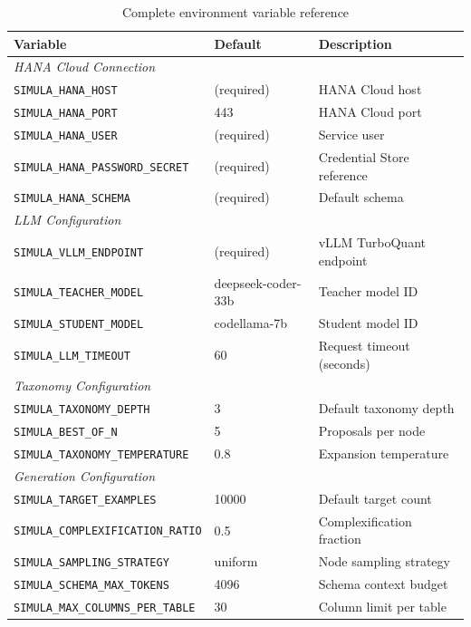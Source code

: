 \documentclass[12pt,a4paper,twoside]{report}
\begin{document}
\begin{table}[H]
\centering
\caption{Complete environment variable reference}
\label{tab:env-vars-complete}
\scriptsize
\begin{tabularx}{\textwidth}{@{}l l X@{}}
\toprule
\textbf{Variable} & \textbf{Default} & \textbf{Description} \\
\midrule
\multicolumn{3}{l}{\textit{HANA Cloud Connection}} \\
\texttt{SIMULA\_HANA\_HOST} & (required) & HANA Cloud host \\
\texttt{SIMULA\_HANA\_PORT} & 443 & HANA Cloud port \\
\texttt{SIMULA\_HANA\_USER} & (required) & Service user \\
\texttt{SIMULA\_HANA\_PASSWORD\_SECRET} & (required) & Credential Store reference \\
\texttt{SIMULA\_HANA\_SCHEMA} & (required) & Default schema \\
\midrule
\multicolumn{3}{l}{\textit{LLM Configuration}} \\
\texttt{SIMULA\_VLLM\_ENDPOINT} & (required) & vLLM TurboQuant endpoint \\
\texttt{SIMULA\_TEACHER\_MODEL} & deepseek-coder-33b & Teacher model ID \\
\texttt{SIMULA\_STUDENT\_MODEL} & codellama-7b & Student model ID \\
\texttt{SIMULA\_LLM\_TIMEOUT} & 60 & Request timeout (seconds) \\
\midrule
\multicolumn{3}{l}{\textit{Taxonomy Configuration}} \\
\texttt{SIMULA\_TAXONOMY\_DEPTH} & 3 & Default taxonomy depth \\
\texttt{SIMULA\_BEST\_OF\_N} & 5 & Proposals per node \\
\texttt{SIMULA\_TAXONOMY\_TEMPERATURE} & 0.8 & Expansion temperature \\
\midrule
\multicolumn{3}{l}{\textit{Generation Configuration}} \\
\texttt{SIMULA\_TARGET\_EXAMPLES} & 10000 & Default target count \\
\texttt{SIMULA\_COMPLEXIFICATION\_RATIO} & 0.5 & Complexification fraction \\
\texttt{SIMULA\_SAMPLING\_STRATEGY} & uniform & Node sampling strategy \\
\texttt{SIMULA\_SCHEMA\_MAX\_TOKENS} & 4096 & Schema context budget \\
\texttt{SIMULA\_MAX\_COLUMNS\_PER\_TABLE} & 30 & Column limit per table \\

\end{tabularx}
\end{table}
\end{document}
